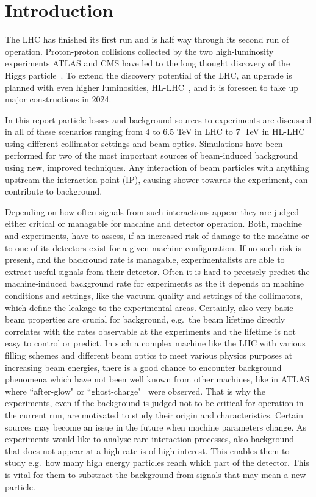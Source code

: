 \section{Introduction}


The LHC has finished its first run and is half way through its second run of operation. Proton-proton collisions collected by the two high-luminosity experiments ATLAS and CMS have led to the long thought discovery of the Higgs particle~\cite{Aad20121,Chatrchyan201230}. To extend the discovery potential of the LHC, an upgrade is planned with even higher luminosities, HL-LHC~\cite{hl-lhc-prel-design}, and it is foreseen to take up major constructions in 2024.

In this report particle losses and background sources to experiments are discussed in all of these scenarios ranging from 4 to 6.5 TeV in LHC to 7~TeV in HL-LHC using different collimator settings and beam optics. Simulations have been performed for two of the most important sources of beam-induced background using new, improved techniques. Any interaction of beam particles with anything upstream the interaction point (IP), causing shower towards the experiment, can contribute to background.

Depending on how often signals from such interactions appear they are judged either critical or managable for machine and detector operation. Both, machine and experiments, have to assess, if an increased risk of damage to the machine or to one of its detectors exist for a given machine configuration. If no such risk is present, and the backround rate is managable, experimentalists are able to extract useful signals from their detector. Often it is hard to precisely predict the machine-induced background rate for experiments as the it depends on machine conditions and settings, like the vacuum quality and settings of the collimators, which define the leakage to the experimental areas. Certainly, also very basic beam properties are crucial for background, e.g.~the beam lifetime directly correlates with the rates observable at the experiments and the lifetime is not easy to control or predict. In such a complex machine like the LHC with various filling schemes and different beam optics to meet various physics purposes at increasing beam energies, there is a good chance to encounter background phenomena which have not been well known from other machines, like in ATLAS where ``after-glow" or ``ghost-charge"~\cite{ATLAS_JINST_13} were observed. That is why the experiments, even if the background is judged not to be critical for operation in the current run, are motivated to study their origin and characteristics. Certain sources may become an issue in the future when machine parameters change. As experiments would like to analyse rare interaction processes, also background that does not appear at a high rate is of high interest. This enables them to study e.g.~how many high energy particles reach which part of the detector. This is vital for them to substract the background from signals that may mean a new particle. 

